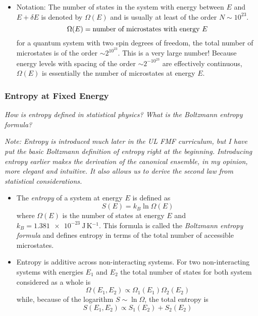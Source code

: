 \documentclass[11pt, a4paper]{article}
\begin{document}
\begin{itemize}
	\item Notation: The number of states in the system with energy between $ E $ and $ E + \delta E $ is denoted by $ \Omega(E) $ and is usually at least of the order $ N \sim 10^{23} $.
	\begin{equation*}
		\Omega(E) = \text{number of microstates with energy $ E $}
	\end{equation*}
	for a quantum system with two spin degrees of freedom, the total number of microstates is of the order $ \sim 2^{10^{23}} $. This is a very large number! Because energy levels with spacing of the order $ \sim 2^{-10^{23}} $ are effectively continuous, $ \Omega(E) $ is essentially the number of microstates at energy $ E $.
	

\end{itemize}

\subsubsection{Entropy at Fixed Energy} \label{sss:entropy_fixed_E}
\textit{How is entropy defined in statistical physics? What is the Boltzmann entropy formula?}

\smallskip
\textit{Note: Entropy is introduced much later in the UL FMF curriculum, but I have put the basic Boltzmann definition of entropy right at the beginning. Introducing entropy earlier makes the derivation of the canonical ensemble, in my opinion, more elegant and intuitive. It also allows us to derive the second law from statistical considerations.}
\begin{itemize}
	\item The \textit{entropy} of a system at energy $ E $ is defined as
	\begin{equation*}
		S(E) = k_{B} \ln \Omega(E)
	\end{equation*}
	where $ \Omega(E) $ is the number of states at energy $ E $ and $ k_{B} = \SI{1.381e-23}{\joule \, \kelvin^{-1}} $. This formula is called the \textit{Boltzmann entropy formula} and defines entropy in terms of the total number of accessible microstates.
	
	\item Entropy is additive across non-interacting systems. For two non-interacting systems with energies $ E_{1} $ and $ E_{2} $ the total number of states for both system considered as a whole is 
	\begin{equation*}
		\Omega(E_{1}, E_{2}) \propto \Omega_{1}(E_{1})\Omega_{2}(E_{2})
	\end{equation*}
	while, because of the logarithm $ S \sim \ln \Omega $, the total entropy is
	\begin{equation*}
		S(E_{1}, E_{2}) \propto S_{1}(E_{2}) + S_{2}(E_{2})
	\end{equation*}
\end{itemize}
\end{document}
